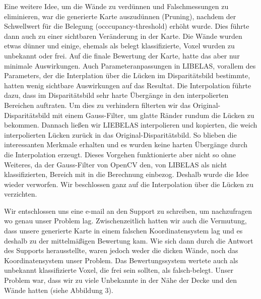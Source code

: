 \documentclass[12pt,titlepage, a4paper]{article}
\begin{document}
Eine weitere Idee, um die Wände zu verdünnen und Falschmessungen zu eliminieren, war die generierte Karte auszudünnen (Pruning), nachdem der Schwellwert für die Belegung (occcupancy-threshold) erhöht wurde. Dies führte dann auch zu einer sichtbaren Veränderung in der Karte. Die Wände wurden etwas dünner und einige, ehemals als belegt klassifizierte, Voxel wurden zu unbekannt oder frei. Auf die finale Bewertung der Karte, hatte das aber nur minimale Auswirkungen. Auch Parameteranpassungen in LIBELAS, vorallem des Parameters, der die Interplation über die Lücken im Disparitätsbild bestimmte, hatten wenig sichtbare Auswirkungen auf das Resultat. Die Interpolation führte dazu, dass im Disparitätsbild sehr harte Übergänge in den interpolierten Bereichen auftraten. Um dies zu verhindern filterten wir das Original-Disparitätsbild mit einem Gauss-Filter, um glatte Ränder rundum die Lücken zu bekommen. Dannach ließen wir LIEBELAS interpolieren und kopierten, die weich interpolierten Lücken zurück in das Original-Disparitätsbild. So blieben die interessanten Merkmale erhalten und es wurden keine harten Übergänge durch die Interpolation erzeugt. Dieses Vorgehen funktionierte aber nicht so ohne Weiteres, da der Gauss-Filter von OpenCV den, von LIBELAS als nicht klassifizierten, Bereich mit in die Berechnung einbezog. Deshalb wurde die Idee wieder verworfen. Wir beschlossen ganz auf die Interpolation über die Lücken zu verzichten.

Wir entschlossen uns eine e-mail an den Support zu schreiben, um nachzufragen wo genau unser Problem lag.
Zwischenzeitlich hatten wir auch die Vermutung, dass unsere generierte Karte in einem falschen Koordinatensystem lag und es deshalb zu der mittelmäßigen Bewertung kam.
Wie sich dann durch die Antwort des Supports herausstellte, waren jedoch weder die dicken Wände, noch das Koordinatensystem unser Problem. Das Bewertungssystem wertete auch als unbekannt klassifizierte Voxel, die frei sein sollten, als falsch-belegt. Unser Problem war, dass wir zu viele Unbekannte in der Nähe der Decke und den Wände hatten (siehe Abbildung 3).
\end{document}
